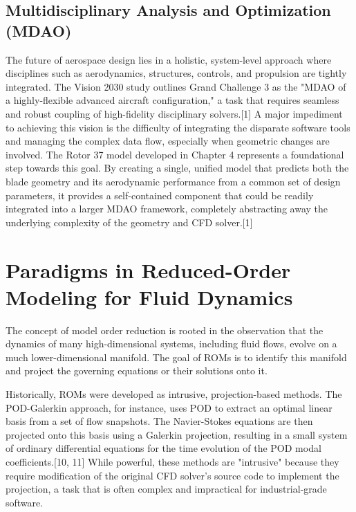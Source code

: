 \documentclass[12pt, a4paper]{report}
\begin{document}
\subsection{Multidisciplinary Analysis and Optimization (MDAO)}
The future of aerospace design lies in a holistic, system-level approach where disciplines such as aerodynamics, structures, controls, and propulsion are tightly integrated. The Vision 2030 study outlines Grand Challenge 3 as the "MDAO of a highly-flexible advanced aircraft configuration," a task that requires seamless and robust coupling of high-fidelity disciplinary solvers.[1] A major impediment to achieving this vision is the difficulty of integrating the disparate software tools and managing the complex data flow, especially when geometric changes are involved. The Rotor 37 model developed in Chapter 4 represents a foundational step towards this goal. By creating a single, unified model that predicts both the blade geometry and its aerodynamic performance from a common set of design parameters, it provides a self-contained component that could be readily integrated into a larger MDAO framework, completely abstracting away the underlying complexity of the geometry and CFD solver.[1]

\section{Paradigms in Reduced-Order Modeling for Fluid Dynamics}

The concept of model order reduction is rooted in the observation that the dynamics of many high-dimensional systems, including fluid flows, evolve on a much lower-dimensional manifold. The goal of ROMs is to identify this manifold and project the governing equations or their solutions onto it.

Historically, ROMs were developed as intrusive, projection-based methods. The POD-Galerkin approach, for instance, uses POD to extract an optimal linear basis from a set of flow snapshots. The Navier-Stokes equations are then projected onto this basis using a Galerkin projection, resulting in a small system of ordinary differential equations for the time evolution of the POD modal coefficients.[10, 11] While powerful, these methods are "intrusive" because they require modification of the original CFD solver's source code to implement the projection, a task that is often complex and impractical for industrial-grade software.
\end{document}
